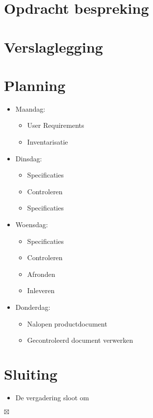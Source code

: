 \documentclass[]{article}
\begin{document}
\section{Opdracht bespreking}


\section{Verslaglegging}


\section{Planning}

\begin{itemize}
   \item Maandag:
    \begin{itemize}
      \item User Requirements
      \item Inventarisatie
    \end{itemize}
    \item Dinsdag:
      \begin{itemize}
        \item Specificaties
        \item Controleren
        \item Specificaties
      \end{itemize}
    \item Woensdag:
      \begin{itemize}
        \item Specificaties
        \item Controleren
        \item Afronden
        \item Inleveren
      \end{itemize}
    \item Donderdag:
      \begin{itemize}
        \item Nalopen productdocument
        \item Gecontroleerd document verwerken
      \end{itemize}

\end{itemize}

\section{Sluiting}
  \begin{itemize}
    \item De vergadering sloot om
  \end{itemize}

$\boxtimes$
\end{document}
